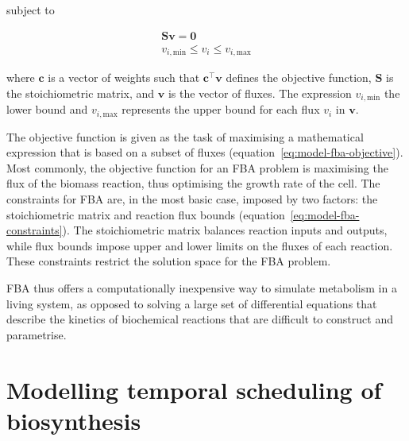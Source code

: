 subject to

\begin{equation}
  \begin{gathered}
    \mathbf{S} \mathbf{v} = \mathbf{0}\\
    v_{i,\mathrm{min}} \leq v_{i} \leq v_{i,\mathrm{max}}
  \end{gathered}
  \label{eq:model-fba-constraints}
\end{equation}

where $\mathbf{c}$ is a vector of weights such that $\mathbf{c}^{\intercal} \mathbf{v}$ defines the objective function, $\mathbf{S}$ is the stoichiometric matrix, and $\mathbf{v}$ is the vector of fluxes. The expression $v_{i,\mathrm{min}}$ the lower bound and $v_{i,\mathrm{max}}$ represents the upper bound for each flux $v_{i}$ in $\mathbf{v}$.

The objective function is given as the task of maximising a mathematical expression that is based on a subset of fluxes (equation~\ref{eq:model-fba-objective}).
Most commonly, the objective function for an FBA problem is maximising the flux of the biomass reaction, thus optimising the growth rate of the cell.
The constraints for FBA are, in the most basic case, imposed by two factors:
the stoichiometric matrix and reaction flux bounds (equation~\ref{eq:model-fba-constraints}).
The stoichiometric matrix balances reaction inputs and outputs, while flux bounds impose upper and lower limits on the fluxes of each reaction.
These constraints restrict the solution space for the FBA problem.

FBA thus offers a computationally inexpensive way to simulate metabolism in a living system, as opposed to solving a large set of differential equations that describe the kinetics of biochemical reactions that are difficult to construct and parametrise.

\section{Modelling temporal scheduling of biosynthesis}
\label{sec:model-temporal}

